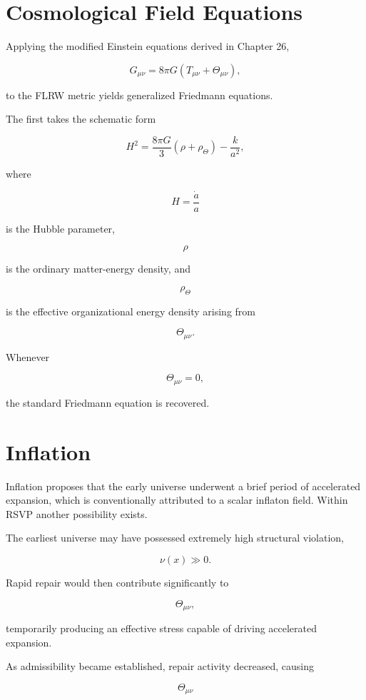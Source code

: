 \documentclass[11pt,oneside]{book}
\numberwithin{equation}{chapter}
\theoremstyle{definition}
\theoremstyle{plain}
\begin{document}
\section{Cosmological Field Equations}

Applying the modified Einstein equations derived in Chapter 26,

\[
G_{\mu\nu}
=
8\pi G
\left(
T_{\mu\nu}
+
\Theta_{\mu\nu}
\right),
\]

to the FLRW metric yields generalized Friedmann equations.

The first takes the schematic form

\[
\boxed{
H^2
=
\frac{8\pi G}{3}
\left(
\rho
+
\rho_\Theta
\right)
-
\frac{k}{a^2},
}
\]

where

\[
H
=
\frac{\dot a}{a}
\]

is the Hubble parameter,

\[
\rho
\]

is the ordinary matter-energy density, and

\[
\rho_\Theta
\]

is the effective organizational energy density arising from

\[
\Theta_{\mu\nu}.
\]

Whenever

\[
\Theta_{\mu\nu}=0,
\]

the standard Friedmann equation is recovered.

\section{Inflation}

Inflation proposes that the early universe underwent a brief period of accelerated expansion, which is conventionally attributed to a scalar inflaton field. Within RSVP another possibility exists.

The earliest universe may have possessed extremely high structural
violation,

\[
\nu(x)\gg0.
\]

Rapid repair would then contribute significantly to

\[
\Theta_{\mu\nu},
\]

temporarily producing an effective stress capable of driving accelerated
expansion.

As admissibility became established, repair activity decreased, causing

\[
\Theta_{\mu\nu}
\]
\end{document}
